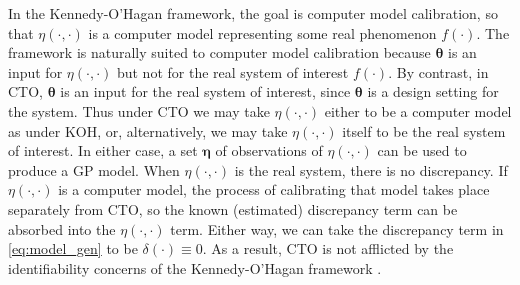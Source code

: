 \documentclass[twocolumn,10pt]{asme2ej}
\begin{document}
%

%
In the Kennedy-O'Hagan framework, the goal is computer model calibration, so that $\eta(\cdot,\cdot)$ is a computer model representing some real phenomenon $f(\cdot)$. 
%
The framework is naturally suited to computer model calibration because $\boldsymbol\theta$ is an input for $\eta(\cdot,\cdot)$ but not for the real system of interest $f(\cdot)$.
%
By contrast, in CTO, $\boldsymbol\theta$ is an input for the real system of interest, since $\boldsymbol\theta$ is a design setting for the system.
%
Thus under CTO we may take $\eta(\cdot,\cdot)$ either to be a computer model as under KOH, or, alternatively, we may take $\eta(\cdot,\cdot)$ itself to be the real system of interest.
%
In either case, a set $\boldsymbol\eta$ of observations of $\eta(\cdot,\cdot)$ can be used to produce a GP model.
%
When $\eta(\cdot,\cdot)$ is the real system, there is no discrepancy.
%
If $\eta(\cdot,\cdot)$ is a computer model, the process of calibrating that model takes place separately from CTO, so the known (estimated) discrepancy term can be absorbed into the $\eta(\cdot,\cdot)$ term. Either way, we can take the discrepancy term in \eqref{eq:model_gen} to be $\delta(\cdot)\equiv0$. As a result, CTO is not afflicted by the identifiability concerns of the Kennedy-O'Hagan framework \cite{Bayarri2007,Tuo2016}.

%

%
\end{document}
